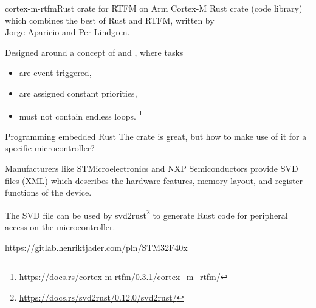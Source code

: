 \documentclass[
  aspectratio=169,
]{beamer}
\begin{document}
\begin{frame}[fragile]{cortex-m-rtfm}{Rust crate for RTFM on Arm Cortex-M}
Rust crate (code library) which combines the best of Rust and RTFM, written by \\Jorge Aparicio and Per Lindgren.

\vspace{2mm}

Designed around a concept of  and , where tasks 
\begin{itemize}
  \item are \alert{event triggered},
  \item are assigned \alert{constant priorities},
  \item must not contain endless loops. \footnote{\url{https://docs.rs/cortex-m-rtfm/0.3.1/cortex_m_rtfm/}}
\end{itemize}
\end{frame}


\begin{frame}{Programming embedded Rust}{}
The  crate is great, but how to make use of it for a specific microcontroller? 

\vspace{2mm}

Manufacturers like STMicroelectronics and NXP Semiconductors provide \alert{SVD files} (XML) which describes the hardware features, memory layout, and register functions of the device.

\vspace{2mm}

The SVD file can be used by \alert{svd2rust}\footnote{\url{https://docs.rs/svd2rust/0.12.0/svd2rust/}} to generate Rust code for peripheral access on the microcontroller.

\vspace{2mm}

\url{https://gitlab.henriktjader.com/pln/STM32F40x}

\end{frame}
\end{document}
